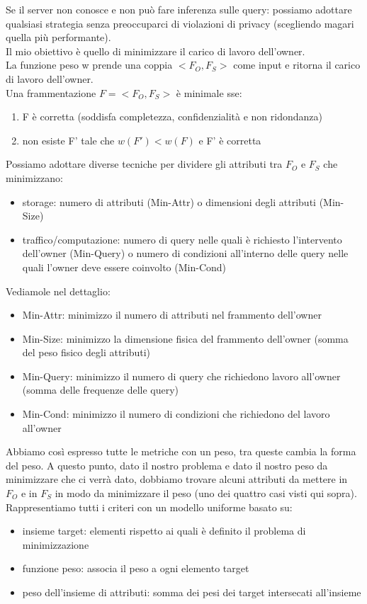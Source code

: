 Se il server non conosce e non può fare inferenza sulle query: possiamo adottare qualsiasi strategia senza preoccuparci di violazioni di privacy (scegliendo magari quella più performante).\\
Il mio obiettivo è quello di minimizzare il carico di lavoro dell'owner.\\
La funzione peso w prende una coppia \(<F_O, F_S>\) come input e ritorna il carico di lavoro dell'owner.\\
Una frammentazione \(F = <F_O, F_S>\) è minimale sse:
\begin{enumerate}
    \item F è corretta (soddisfa completezza, confidenzialità e non ridondanza)
    \item non esiste F' tale che \(w(F') < w(F)\) e F' è corretta
\end{enumerate}
Possiamo adottare diverse tecniche per dividere gli attributi tra \(F_O\) e \(F_S\) che minimizzano:
\begin{itemize}
    \item storage: numero di attributi (Min-Attr) o dimensioni degli attributi (Min-Size)
    \item traffico/computazione: numero di query nelle quali è richiesto l'intervento dell'owner (Min-Query) o numero di condizioni all'interno delle query nelle quali l'owner deve essere coinvolto (Min-Cond)
\end{itemize}
Vediamole nel dettaglio:
\begin{itemize}
    \item Min-Attr: minimizzo il numero di attributi nel frammento dell'owner
    \item Min-Size: minimizzo la dimensione fisica del frammento dell'owner (somma del peso fisico degli attributi)
    \item Min-Query: minimizzo il numero di query che richiedono lavoro all'owner (somma delle frequenze delle query)
    \item Min-Cond: minimizzo il numero di condizioni che richiedono del lavoro all'owner
\end{itemize}
Abbiamo così espresso tutte le metriche con un peso, tra queste cambia la forma del peso.
A questo punto, dato il nostro problema e dato il nostro peso da minimizzare che ci verrà dato, dobbiamo trovare alcuni attributi da mettere in \(F_O\) e in \(F_S\) in modo da minimizzare il peso (uno dei quattro casi visti qui sopra).
Rappresentiamo tutti i criteri con un modello uniforme basato su:
\begin{itemize}
    \item insieme target: elementi rispetto ai quali è definito il problema di minimizzazione
    \item funzione peso: associa il peso a ogni elemento target
    \item peso dell'insieme di attributi: somma dei pesi dei target intersecati all'insieme
\end{itemize}
